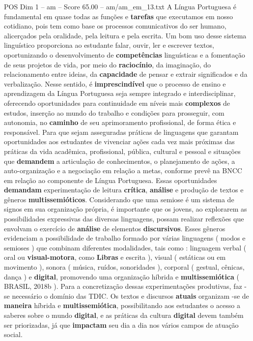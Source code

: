 \begin{textsample}{POS Dim 1 – am – Score 65.00 – am/am\_em\_13.txt}
A Língua Portuguesa é fundamental em quase todas as funções e \textbf{tarefas} que executamos em nosso cotidiano, pois tem como base os processos comunicativos do ser humano, alicerçados pela oralidade, pela leitura e pela escrita.
Um bom uso desse sistema linguístico proporciona ao estudante falar, ouvir, ler e escrever textos, oportunizando o desenvolvimento de \textbf{competências} linguísticas e a fomentação de seus projetos de vida, por meio do \textbf{raciocínio}, da imaginação, do relacionamento entre ideias, da \textbf{capacidade} de pensar e extrair significados e da verbalização.
Nesse sentido, é \textbf{imprescindível} que o processo de ensino e aprendizagem da Língua Portuguesa seja sempre integrado e interdisciplinar, oferecendo oportunidades para continuidade em níveis mais \textbf{complexos} de estudos, inserção ao mundo do trabalho e condições para prosseguir, com autonomia, no \textbf{caminho} de seu aprimoramento profissional, de forma ética e responsável.
Para que sejam asseguradas práticas de linguagens que garantam oportunidades aos estudantes de vivenciar ações cada vez mais próximas das práticas da vida acadêmica, profissional, pública, cultural e pessoal e situações que \textbf{demandem} a articulação de conhecimentos, o planejamento de ações, a auto-organização e a negociação em relação a metas, conforme prevê na BNCC em relação ao componente de Língua Portuguesa.
Essas oportunidades \textbf{demandam} experimentação de leitura \textbf{crítica}, \textbf{análise} e produção de textos e gêneros \textbf{multissemióticos}.
Considerando que uma semiose é um sistema de signos em sua organização própria, é importante que os jovens, ao explorarem as possibilidades expressivas das diversas linguagens, possam realizar reflexões que envolvam o exercício de \textbf{análise} de elementos \textbf{discursivos}.
Esses gêneros evidenciam a possibilidade de trabalho formado por várias linguagens ( modos e semioses ) que combinam diferentes modalidades, tais como : linguagem verbal ( oral ou \textbf{visual-motora}, como \textbf{Libras} e escrita ), visual ( estáticas ou em movimento ), sonora ( música, ruídos, sonoridades ), corporal ( gestual, cênicas, dança ) e \textbf{digital}, promovendo uma organização híbrida e \textbf{multissemiótica} ( BRASIL, 2018b ).
Para a concretização dessas experimentações produtivas, faz -se necessário o domínio das TDIC.
Os textos e discursos \textbf{atuais} organizam -se de \textbf{maneira} híbrida e \textbf{multissemiótica}, possibilitando aos estudantes o acesso a saberes sobre o mundo \textbf{digital}, e as práticas da cultura \textbf{digital} devem também ser priorizadas, já que \textbf{impactam} seu dia a dia nos vários campos de atuação social.

\end{textsample}
